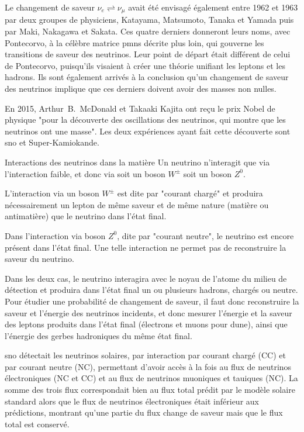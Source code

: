       Le changement de saveur $\nu_e\rightleftharpoons\nu_{\mu}$ avait été envisagé également entre 1962 et 1963 par deux groupes de physiciens, Katayama, Matsumoto, Tanaka et Yamada\cite{Nakagawa1963} puis par Maki,  Nakagawa et  Sakata\cite{Maki1962}. Ces quatre derniers donneront leurs noms, avec Pontecorvo, à la célèbre matrice \gls{pmns} décrite plus loin, qui gouverne les transitions de saveur des neutrinos. Leur point de départ était différent de celui de Pontecorvo, puisqu'ils visaient à créer une théorie unifiant les leptons et les hadrons. Ils sont également arrivés à la conclusion qu'un changement de saveur des neutrinos implique que ces derniers doivent avoir des masses non nulles.

      En 2015, Arthur~B.~McDonald et Takaaki Kajita ont reçu le prix Nobel de physique "pour la découverte des oscillations des neutrinos, qui montre que les neutrinos ont une masse". Les deux expériences ayant fait cette découverte sont \gls{sno}\cite{Aharmim2013} et Super-Kamiokande\cite{Fukuda1998}.

    \begin{activitybox}[label=box::courants]{Interactions des neutrinos dans la matière}
      Un neutrino n'interagit que via l'interaction faible, et donc via soit un boson $W^{\pm}$ soit un boson $Z^0$. 

      L'interaction via un boson $W^{\pm}$ est dite par "courant chargé" et produira nécessairement un lepton de même saveur et de même nature (matière ou antimatière) que le neutrino dans l'état final.
      
      Dans l'interaction via boson $Z^0$, dite par "courant neutre", le neutrino est encore présent dans l'état final. Une telle interaction ne permet pas de reconstruire la saveur du neutrino.

      Dans les deux cas, le neutrino interagira avec le noyau de l'atome du milieu de détection et produira dans l'état final un ou plusieurs hadrons, chargés ou neutre. Pour étudier une probabilité de changement de saveur, il faut donc reconstruire la saveur et l'énergie des neutrinos incidents, et donc mesurer l'énergie et la saveur des leptons produits dans l'état final (électrons et muons pour \gls{dune}), ainsi que l'énergie des gerbes hadroniques du même état final.
    \end{activitybox}

      \gls{sno} détectait les neutrinos solaires, par interaction par courant chargé (CC) et par courant neutre (NC), permettant d'avoir accès à la fois au flux de neutrinos électroniques (NC et CC) et au flux de neutrinos muoniques et tauiques (NC). La somme des trois flux correspondait bien au flux total prédit par le modèle solaire standard alors que le flux de neutrinos électroniques était inférieur aux prédictions, montrant qu'une partie du flux change de saveur mais que le flux total est conservé.

